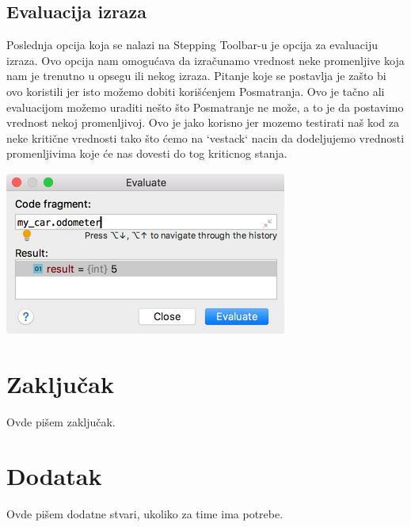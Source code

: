 \documentclass[a4paper]{article}
\begin{document}
\subsection{Evaluacija izraza}
Poslednja opcija koja se nalazi na Stepping Toolbar-u je opcija za evaluaciju izraza. Ovo opcija nam omogućava da izračunamo vrednost neke promenljive koja nam je trenutno u opsegu ili nekog izraza. Pitanje koje se postavlja je zašto bi ovo koristili jer isto možemo dobiti korišćenjem Posmatranja. Ovo je tačno ali evaluacijom možemo uraditi nešto što Posmatranje ne može, a to je da postavimo vrednost nekoj promenljivoj. Ovo je jako korisno jer mozemo testirati naš kod za neke kritične vrednosti tako što ćemo na `vestack` nacin da dodeljujemo vrednosti promenljivima koje će nas dovesti do tog kriticnog stanja.

\includegraphics[scale = 0.4]{4}
\section{Zaključak}
\label{sec:zakljucak}

Ovde pišem zaključak. 


\appendix
 


\appendix
\section{Dodatak}
Ovde pišem dodatne stvari, ukoliko za time ima potrebe.
\end{document}
